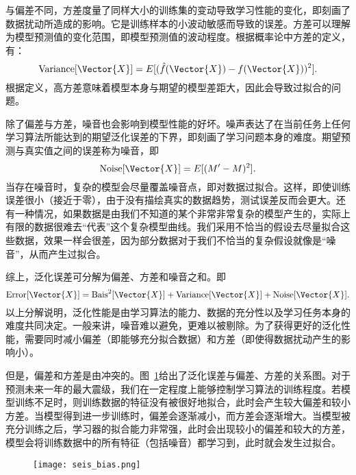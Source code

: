 与偏差不同，方差度量了同样大小的训练集的变动导致学习性能的变化，即刻画了数据扰动所造成的影响。它是训练样本的小波动敏感而导致的误差。方差可以理解为模型预测值的变化范围，即模型预测值的波动程度。根据概率论中方差的定义，有：
\begin{equation}
  \mathrm{Variance}[\Vector{X}]=E[(\hat{f}(\Vector{X})-f(\Vector{X}))^2].
\end{equation}
根据定义，高方差意味着模型本身与期望的模型差距大，因此会导致过拟合的问题。

除了偏差与方差，噪音也会影响到模型性能的好坏。噪声表达了在当前任务上任何学习算法所能达到的期望泛化误差的下界，即刻画了学习问题本身的难度。期望预测与真实值之间的误差称为噪音，即
\begin{equation}
  \mathrm{Noise}[\Vector{X}]=E[(M^{\prime}-M)^2].
\end{equation}
当存在噪音时，复杂的模型会尽量覆盖噪音点，即对数据过拟合。这样，即使训练误差很小（接近于零），由于没有描绘真实的数据趋势，测试误差反而会更大。还有一种情况，如果数据是由我们不知道的某个非常非常复杂的模型产生的，实际上有限的数据很难去“代表”这个复杂模型曲线。我们采用不恰当的假设去尽量拟合这些数据，效果一样会很差，因为部分数据对于我们不恰当的复杂假设就像是“噪音”，从而产生过拟合。

综上，泛化误差可分解为偏差、方差和噪音之和。即
\begin{equation}
  \mathrm{Error}[\Vector{X}]=\mathrm{Bais}^2[\Vector{X}]+\mathrm{Variance}[\Vector{X}]+\mathrm{Noise}[\Vector{X}].
\end{equation}
以上分解说明，泛化性能是由学习算法的能力、数据的充分性以及学习任务本身的难度共同决定。一般来讲，噪音难以避免，更难以被剔除。为了获得更好的泛化性能，需要同时减小偏差（即能够充分拟合数据）和方差（即使得数据扰动产生的影响小）。

但是，偏差和方差是由冲突的。图~\ref{fig:seis_bias}给出了泛化误差与偏差、方差的关系图。对于预测未来一年的最大震级，我们在一定程度上能够控制学习算法的训练程度。若模型训练不足时，则训练数据的特征没有被很好地拟合，此时会产生较大偏差和较小方差。当模型得到进一步训练时，偏差会逐渐减小，而方差会逐渐增大。当模型被充分训练之后，学习器的拟合能力非常强，此时会出现较小的偏差和较大的方差，模型会将训练数据中的所有特征（包括噪音）都学习到，此时就会发生过拟合。

\begin{figure}[!htbp]
    \centering
    \texttt{[image: seis\_bias.png]}
    \label{fig:seis_bias}
\end{figure}

